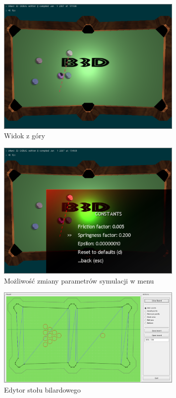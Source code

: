 \begin{figure}[htp]
  \centering
  \includegraphics[width=0.8\textwidth]{./img/scr03.eps}
  \caption{Widok z góry}
  \label{fig:scr3}
\end{figure}

\begin{figure}[htp]
  \centering
  \includegraphics[width=0.8\textwidth]{./img/scr04.eps}
  \caption{Możliwość zmiany parametrów symulacji w menu}
  \label{fig:scr4}
\end{figure}

\begin{figure}[htp]
  \centering
  \includegraphics[width=0.8\textwidth]{./img/scr05.eps}
  \caption{Edytor stołu bilardowego}
  \label{fig:scr5}
\end{figure}
